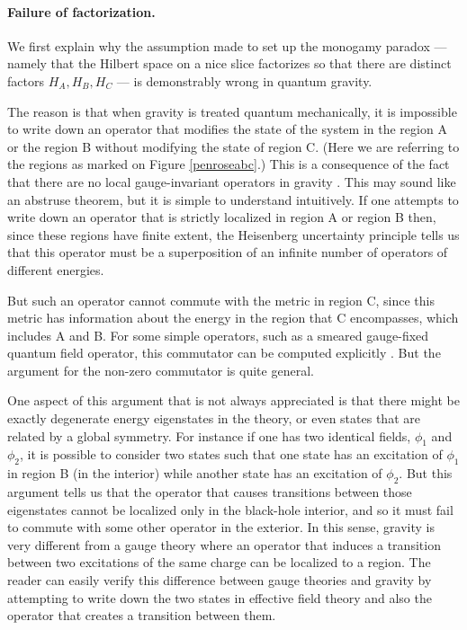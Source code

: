 \documentclass[12pt]{article}
\begin{document}
\paragraph{\bf Failure of factorization.}
We first  explain why the assumption made to set up the monogamy paradox --- namely that the  Hilbert space on a nice slice factorizes so that there are distinct factors $H_{A}, H_{B}, H_{C}$ --- is demonstrably wrong in quantum gravity.

The reason is that when gravity is treated quantum mechanically, it is impossible to write down an operator that modifies the state of the system  in the region A or the region B without modifying the state of region C. (Here we are referring to the regions as marked on Figure \ref{penroseabc}.)   This is a consequence of the fact that there are no local gauge-invariant operators in gravity \cite{dewitt1960quantization, kuchar1991problem, Giddings:2005id}. This may sound like an abstruse theorem, but it is simple to understand intuitively.  If one attempts to write down an operator that is strictly localized in region A or region B  then, since these regions have finite extent, the Heisenberg uncertainty principle tells us that this operator must be a superposition of an infinite number of operators of different energies.

But such an operator cannot commute with the metric in region C, since this metric has information about the energy in the region that C encompasses, which includes A and B. For some simple operators, such as a smeared gauge-fixed quantum field operator, this commutator can be computed explicitly \cite{Donnelly:2018nbv}. But the argument for the non-zero commutator is quite general.

One aspect of this argument that is not always appreciated is that there might be exactly degenerate energy eigenstates in the theory, or even states that are related by a global symmetry. For instance if one has two identical fields, $\phi_1$ and $\phi_2$, it is possible to consider two states such that one state has an excitation of $\phi_1$ in region B (in the interior) while another state has an excitation of $\phi_2$.  But this argument tells us that the operator that causes transitions between those eigenstates cannot be localized only in the black-hole interior, and so it must fail to commute with some other operator in the exterior. In this sense, gravity is very different from a gauge theory where an operator that induces a transition between two excitations of the same charge can be localized to a region.  The reader can easily verify this difference between gauge theories and gravity by attempting to write down the two states in effective field theory and also the operator that creates a transition between them.
\end{document}
